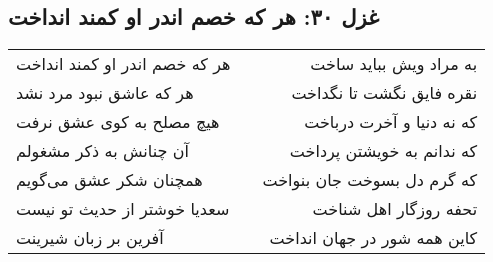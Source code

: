 \begin{center}
\section*{غزل ۳۰: هر که خصم اندر او کمند انداخت}
\label{sec:030}
\begin{longtable}{l p{0.5cm} r}
هر که خصم اندر او کمند انداخت
&&
به مراد ویش بباید ساخت
\\
هر که عاشق نبود مرد نشد
&&
نقره فایق نگشت تا نگداخت
\\
هیچ مصلح به کوی عشق نرفت
&&
که نه دنیا و آخرت درباخت
\\
آن چنانش به ذکر مشغولم
&&
که ندانم به خویشتن پرداخت
\\
همچنان شکر عشق می‌گویم
&&
که گرم دل بسوخت جان بنواخت
\\
سعدیا خوشتر از حدیث تو نیست
&&
تحفه روزگار اهل شناخت
\\
آفرین بر زبان شیرینت
&&
کاین همه شور در جهان انداخت
\\
\end{longtable}
\end{center}
